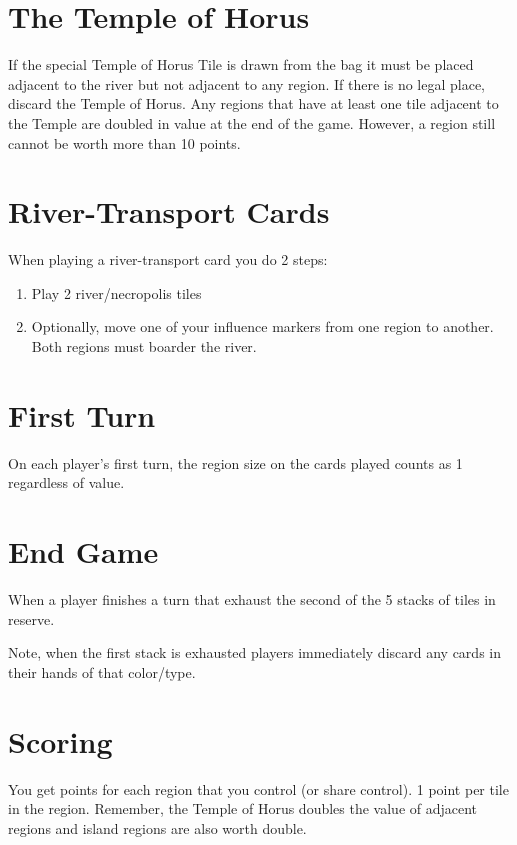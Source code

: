 \documentclass[12pt]{article}
\newenvironment{enumerateCustom}
{\begin{enumerate}
  \setlength{\itemsep}{1pt}
  \setlength{\parskip}{0pt}
  \setlength{\parsep}{0pt}}
{\end{enumerate}}
\begin{document}
\begin{multicols*}{2}
\section*{The Temple of Horus}
If the special Temple of Horus Tile is drawn from the bag it must be placed adjacent to the river but not adjacent to any region. If there is no legal place, discard the Temple of Horus. Any regions that have at least one tile adjacent to the Temple are doubled in value at the end of the game. However, a region still cannot be worth more than 10 points.

\section*{River-Transport Cards}
When playing a river-transport card you do 2 steps:
\begin{enumerateCustom}
    \item Play 2 river/necropolis tiles
    \item Optionally, move one of your influence markers from one region to another. Both regions must boarder the river. 
\end{enumerateCustom}

\section*{First Turn}
On each player's first turn, the region size on the cards played counts as 1 regardless of value.

\section*{End Game}
When a player finishes a turn that exhaust the second of the 5 stacks of tiles in reserve.

Note, when the first stack is exhausted players immediately discard any cards in their hands of that color/type.

\section*{Scoring}
You get points for each region that you control (or share control). 1 point per tile in the region. Remember, the Temple of Horus doubles the value of adjacent regions and island regions are also worth double.

\end{multicols*}
\end{document}
